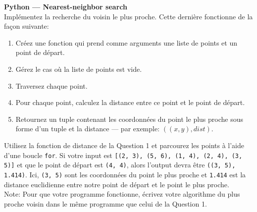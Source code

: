 \begin{Exercice}[10 minutes]\textbf{Python — Nearest-neighbor search}\\

Implémentez la recherche du voisin le plus proche. Cette dernière fonctionne de la façon suivante:
\begin{enumerate}
    \item Créez une fonction qui prend comme arguments une liste de points et un point de départ.
    \item Gérez le cas où la liste de points est vide.
    \item Traversez chaque point.
    \item Pour chaque point, calculez la distance entre ce point et le point de départ.
    \item Retournez un tuple contenant les coordonnées du point le plus proche sous forme d'un tuple et la distance — par exemple: $((x, y), dist)$.
\end{enumerate}
    
\begin{conseil}
    Utilisez la fonction de distance de la Question 1 et parcourez les points à l'aide d'une boucle \lstinline{for}. Si votre input est \lstinline{[(2, 3), (5, 6), (1, 4), (2, 4), (3, 5)]} et que le point de départ est \lstinline{(4, 4)}, alors l'output devra être \lstinline{((3, 5), 1.414)}. Ici, \lstinline{(3, 5)} sont les coordonnées du point le plus proche et \lstinline{1.414} est la distance euclidienne entre notre point de départ et le point le plus proche.  \\
    
    Note: Pour que votre programme fonctionne, écrivez votre algorithme du plus proche voisin dans le même programme que celui de la Question 1.
\end{conseil}
\begin{solution}
    
\end{solution}
\end{Exercice}


